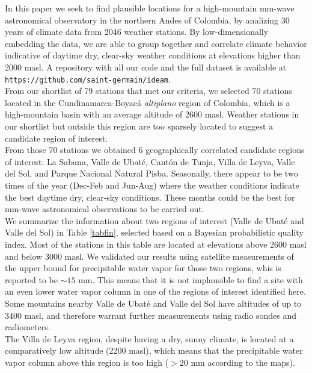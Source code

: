\documentclass[12pt]{iopart}
\begin{document}
In this paper we seek to find plausible locations for a high-mountain mm-wave astronomical observatory in the northern Andes of Colombia, by analizing 30 years of climate data from 2046 weather stations. By low-dimensionally embedding the data, we are able to group together and correlate climate behavior indicative of daytime dry, clear-sky weather conditions at elevations higher than 2000 masl.  A repository with all our code and the full dataset is available at \texttt{https://github.com/saint-germain/ideam}.\\

From our shortlist of 79 stations that met our criteria, we selected 70 stations located  in the Cundinamarca-Boyac\'a \emph{altiplano} region of Colombia, which is a high-mountain basin with an average altitude of 2600 masl. Weather stations in our shortlist but outside this region are too sparsely located to suggest a candidate region of interest. \\

From those 70 stations we obtained 6 geographically correlated candidate regions of interest: La Sabana, Valle de Ubat\'e, Cant\'on de Tunja, Villa de Leyva, Valle del Sol, and Parque Nacional Natural Pisba. Seasonally, there appear to be two times of the year (Dec-Feb and Jun-Aug) where the weather conditions indicate the best daytime dry, clear-sky conditions. These months could be the best for mm-wave astronomical observations to be carried out.\\

We summarize the information about two regions of interest (Valle de Ubat\'e and Valle del Sol) in Table \ref{tabfin}, selected based on a Bayesian probabilistic quality index. Most of the stations in this table are located at elevations above 2600 masl and below 3000 masl. We validated our results using satellite measurements of the upper bound for precipitable water vapor \cite{suen2014,suen2016} for those two regions, whis is reported to be $\sim15$ mm. This means that it is not implausible to find a site with an even lower water vapor column in one of the regions of interest identified here. Some mountains nearby Valle de Ubat\'e and Valle del Sol  have altitudes of up to 3400 masl, and therefore warrant further measurements using radio sondes and radiometers. \\

The Villa de Leyva region, despite having a dry, sunny climate, is located at a comparatively low altitude (2200 masl), which means that the precipitable water vapor column above this region is too high ($>20$ mm according to the  maps).\\
\end{document}
